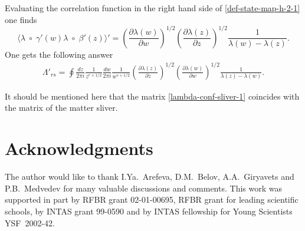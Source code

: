 \documentclass[a4paper,12pt]{article}
\newcommand{\pd}{\partial}
\begin{document}
Evaluating the correlation function in the right hand side of
\eqref{def-state-map-h-2-1} one finds
\begin{equation}
\langle \lambda\;\circ\; \gamma'(w)\lambda\;\circ\; \beta'(z) \rangle'
=\left(\frac{\pd\lambda(w)}{\pd w}\right)^{1/2}
\left(\frac{\pd\lambda(z)}{\pd z}\right)^{1/2}
\frac{1}{\lambda(w)-\lambda(z)}.
\end{equation}
One gets the following answer
\begin{gather}
\Lambda'{}_{rs}=\oint\frac{dz}{2\pi i}\frac{1}{z^{r+1/2}}
\frac{dw}{2\pi i}\frac{1}{w^{s+1/2}}
\left(\frac{\pd\lambda(z)}{\pd z}\right)^{1/2}
\left(\frac{\pd\lambda(w)}{\pd w}\right)^{1/2}
\frac{1}{\lambda(z)-\lambda(w)}.\label{lambda-conf-sliver-1}
\end{gather}

It should be mentioned here that the matrix
\eqref{lambda-conf-sliver-1} coincides with the matrix of the matter
sliver.


\section*{Acknowledgments}

The author would like to thank I.Ya.~Arefeva, D.M.~Belov, A.A.~Giryavets and
P.B.~Medvedev for many valuable discussions and comments.
 This work was supported in part by RFBR grant
02-01-00695, RFBR grant for leading scientific schools, by
INTAS grant 99-0590 and by INTAS fellowship for Young Scientists YSF~2002-42.


\end{document}
